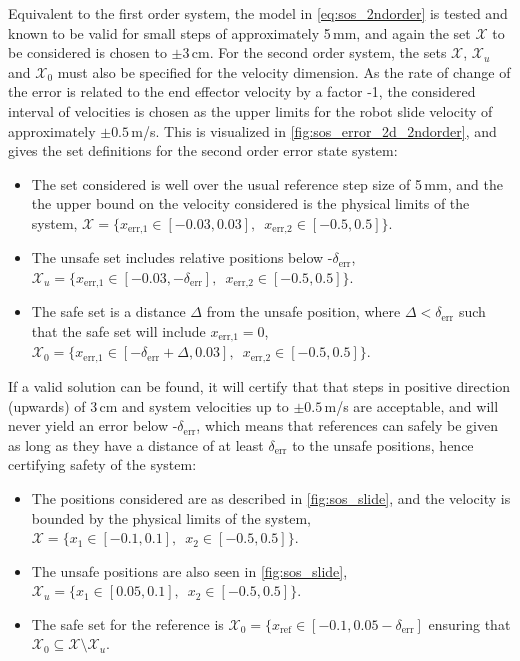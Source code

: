 Equivalent to the first order system, the model in \autoref{eq:sos_2ndorder} is tested and known to be valid for small steps of approximately 5\,mm, and again the set $\mathcal{X}$ to be considered is chosen to $\pm 3$\,cm.
For the second order system, the sets $\mathcal{X}$, $\mathcal{X}_u$ and $\mathcal{X}_0$ must also be specified for the velocity dimension. As the rate of change of the error is related to the end effector velocity by a factor -1, the considered interval of velocities is chosen as the upper limits for the robot slide velocity of approximately $\pm 0.5$\,m/s. This is visualized in \autoref{fig:sos_error_2d_2ndorder}, and gives the set definitions for the second order error state system:
\vspace{-2mm}
\begin{itemize}
\itemsep-0.7mm
\item The set considered is well over the usual reference step size of 5\,mm, and the the upper bound on the velocity  considered is the physical limits of the system, $\mathcal{X}=\{x_\text{err,1}\in[-0.03,0.03], \,\,\, x_\text{err,2}\in[-0.5,0.5] \}$.
\item The unsafe set includes relative positions below -$\delta_\text{err}$, $\mathcal{X}_u=\{x_\text{err,1}\in[-0.03,-\delta_\text{err}],\,\,\, x_\text{err,2}\in[-0.5,0.5] \}$.
\item The safe set is a distance $\Delta$ from the unsafe position, where $\Delta<\delta_\text{err}$ such that the safe set will include $x_\text{err,1}=0$, $\mathcal{X}_0=\{x_\text{err,1}\in[-\delta_\text{err}+\Delta,0.03], \,\,\, x_\text{err,2}\in[-0.5,0.5] \}$.
\end{itemize}

If a valid solution can be found, it will certify that that steps in positive direction (upwards) of 3\,cm and system velocities up to $\pm 0.5$\,m/s are acceptable, and will never yield an error below -$\delta_\text{err}$, which means that references can safely be given as long as they have a distance of at least $\delta_\text{err}$ to the unsafe positions, hence certifying safety of the system:
\vspace{-2mm}
\begin{itemize}
\itemsep-0.7mm
\item The positions considered are as described in \autoref{fig:sos_slide}, and the velocity is bounded by the physical limits of the system, $\mathcal{X}=\{x_1\in[-0.1,0.1],\,\,\, x_2\in[-0.5,0.5] \}$.
\item The unsafe positions are also seen in \autoref{fig:sos_slide}, $\mathcal{X}_u=\{x_1\in[0.05,0.1],\,\,\, x_2\in[-0.5,0.5] \}$.
\item The safe set for the reference is $\mathcal{X}_0=\{x_\text{ref}\in[-0.1,0.05-\delta_\text{err}]$ ensuring that $\mathcal{X}_0\subseteq\mathcal{X}\setminus\mathcal{X}_u$.
\end{itemize}

